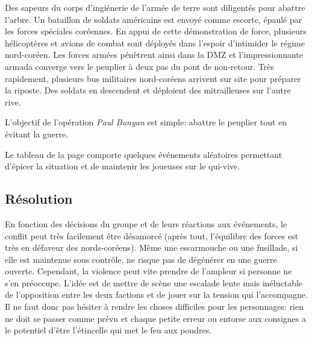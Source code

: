 Des sapeurs du corps d'ingiénerie de l'armée de terre sont diligentés pour abattre l'arbre.
Un bataillon de soldats américains est envoyé comme escorte, épaulé par les forces spéciales coréennes.
En appui de cette démonstration de force, plusieurs hélicoptères et avions de combat sont déployés dans l'espoir d'intimider le régime nord-coréen.
Les forces armées pénètrent ainsi dans la DMZ et l'impressionnante armada converge vers le peuplier à deux pas du pont de non-retour.
Très rapidement, plusieurs bus militaires nord-coréens arrivent sur site pour préparer la riposte.
Des soldats en descendent et déploient des mitrailleuses sur l'autre rive.

L'objectif de l'opération \emph{Paul Bunyan} est simple: abattre le peuplier tout en évitant la guerre.

Le tableau de la page \pageref{table:peuplier} comporte quelques événements aléatoires permettant d'épicer la situation et de maintenir les joueuses sur le qui-vive.

\subsection{Résolution}

En fonction des décisions du groupe et de leurs réactions aux événements, le conflit peut très facilement être désamorcé (après tout, l'équilibre des forces est très en défaveur des nords-coréens).
Même une escarmouche ou une fusillade, si elle est maintenue sous contrôle, ne risque pas de dégénérer en une guerre ouverte.
Cependant, la violence peut vite prendre de l'ampleur si personne ne s'en préoccupe.
L'idée est de mettre de scène une escalade lente mais inéluctable de l'opposition entre les deux factions et de jouer sur la tension qui l'accompagne.
Il ne faut donc pas hésiter à rendre les choses difficiles pour les personnages: rien ne doit se passer comme prévu et chaque petite erreur ou entorse aux consignes a le potentiel d'être l'étincelle qui met le feu aux poudres.

